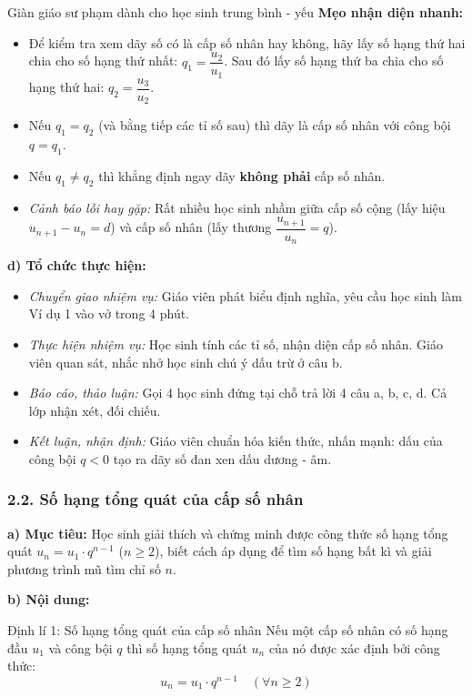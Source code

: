 \documentclass[12pt, a4paper]{article}
\begin{document}
\begin{scaffoldbox}{Giàn giáo sư phạm dành cho học sinh trung bình - yếu}
\textbf{Mẹo nhận diện nhanh:}
\begin{itemize}[leftmargin=0.6cm]
    \item Để kiểm tra xem dãy số có là cấp số nhân hay không, hãy lấy số hạng thứ hai chia cho số hạng thứ nhất: $q_1 = \dfrac{u_2}{u_1}$. Sau đó lấy số hạng thứ ba chia cho số hạng thứ hai: $q_2 = \dfrac{u_3}{u_2}$.
    \item Nếu $q_1 = q_2$ (và bằng tiếp các tỉ số sau) thì dãy là cấp số nhân với công bội $q = q_1$.
    \item Nếu $q_1 \neq q_2$ thì khẳng định ngay dãy \textbf{không phải} cấp số nhân.
    \item \textit{Cảnh báo lỗi hay gặp:} Rất nhiều học sinh nhầm giữa cấp số cộng (lấy hiệu $u_{n+1} - u_n = d$) và cấp số nhân (lấy thương $\dfrac{u_{n+1}}{u_n} = q$).
\end{itemize}
\end{scaffoldbox}

\noindent \textbf{d) Tổ chức thực hiện:}
\begin{itemize}[leftmargin=0.8cm]
    \item \textit{Chuyển giao nhiệm vụ:} Giáo viên phát biểu định nghĩa, yêu cầu học sinh làm Ví dụ 1 vào vở trong 4 phút.
    \item \textit{Thực hiện nhiệm vụ:} Học sinh tính các tỉ số, nhận diện cấp số nhân. Giáo viên quan sát, nhắc nhở học sinh chú ý dấu trừ ở câu b.
    \item \textit{Báo cáo, thảo luận:} Gọi 4 học sinh đứng tại chỗ trả lời 4 câu a, b, c, d. Cả lớp nhận xét, đối chiếu.
    \item \textit{Kết luận, nhận định:} Giáo viên chuẩn hóa kiến thức, nhấn mạnh: dấu của công bội $q < 0$ tạo ra dãy số đan xen dấu dương - âm.
\end{itemize}

\subsubsection*{2.2. Số hạng tổng quát của cấp số nhân}

\noindent \textbf{a) Mục tiêu:}
Học sinh giải thích và chứng minh được công thức số hạng tổng quát $u_n = u_1 \cdot q^{n-1}$ ($n \ge 2$), biết cách áp dụng để tìm số hạng bất kì và giải phương trình mũ tìm chỉ số $n$.

\noindent \textbf{b) Nội dung:}
\begin{pedabox}{Định lí 1: Số hạng tổng quát của cấp số nhân}
Nếu một cấp số nhân có số hạng đầu $u_1$ và công bội $q$ thì số hạng tổng quát $u_n$ của nó được xác định bởi công thức:
$$u_n = u_1 \cdot q^{n-1} \quad (\forall n \ge 2)$$
\end{pedabox}
\end{document}

